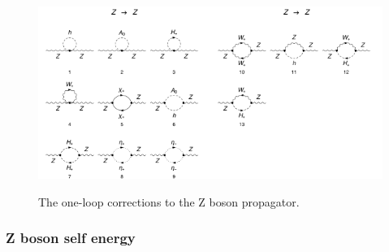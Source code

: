 \documentclass[11pt]{article}
\begin{document}
\begin{figure}[b!]
\center
\includegraphics[width=0.5\textwidth]{diagrams_V[2]_1_1.pdf}\includegraphics[width=0.5\textwidth]{diagrams_V[2]_1_2.pdf}
\caption{The one-loop corrections to the Z boson propagator.}\label{fig:ZZ}
\end{figure}

\subsubsection{Z boson self energy}
\end{document}
